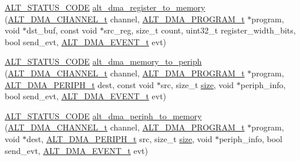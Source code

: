 \begin{DoxyCompactItemize}
\item 
\mbox{\hyperlink{hwlib_8h_abdb0d369f069723ca55d6c94bcaaaa12}{A\+L\+T\+\_\+\+S\+T\+A\+T\+U\+S\+\_\+\+C\+O\+DE}} \mbox{\hyperlink{group__ALT__DMA__STD__OPS_ga8539a5c42c3f59b8640252d203398962}{alt\+\_\+dma\+\_\+register\+\_\+to\+\_\+memory}} (\mbox{\hyperlink{group__ALT__DMA__COMMON_ga959232e3b00ce45a3049183cce4c9d59}{A\+L\+T\+\_\+\+D\+M\+A\+\_\+\+C\+H\+A\+N\+N\+E\+L\+\_\+t}} channel, \mbox{\hyperlink{group__ALT__DMA__PRG_gadb7028531574894854db4db6d797de97}{A\+L\+T\+\_\+\+D\+M\+A\+\_\+\+P\+R\+O\+G\+R\+A\+M\+\_\+t}} $\ast$program, void $\ast$dst\+\_\+buf, const void $\ast$src\+\_\+reg, size\+\_\+t count, uint32\+\_\+t register\+\_\+width\+\_\+bits, bool send\+\_\+evt, \mbox{\hyperlink{group__ALT__DMA__COMMON_gad02f1735ad41b201414e8d032e0f9426}{A\+L\+T\+\_\+\+D\+M\+A\+\_\+\+E\+V\+E\+N\+T\+\_\+t}} evt)
\item 
\mbox{\hyperlink{hwlib_8h_abdb0d369f069723ca55d6c94bcaaaa12}{A\+L\+T\+\_\+\+S\+T\+A\+T\+U\+S\+\_\+\+C\+O\+DE}} \mbox{\hyperlink{group__ALT__DMA__STD__OPS_gab857a70be266b57b97d4dab000dfbaff}{alt\+\_\+dma\+\_\+memory\+\_\+to\+\_\+periph}} (\mbox{\hyperlink{group__ALT__DMA__COMMON_ga959232e3b00ce45a3049183cce4c9d59}{A\+L\+T\+\_\+\+D\+M\+A\+\_\+\+C\+H\+A\+N\+N\+E\+L\+\_\+t}} channel, \mbox{\hyperlink{group__ALT__DMA__PRG_gadb7028531574894854db4db6d797de97}{A\+L\+T\+\_\+\+D\+M\+A\+\_\+\+P\+R\+O\+G\+R\+A\+M\+\_\+t}} $\ast$program, \mbox{\hyperlink{group__ALT__DMA__COMMON_gae9baf8ac891f0583f9c1c61528cc1736}{A\+L\+T\+\_\+\+D\+M\+A\+\_\+\+P\+E\+R\+I\+P\+H\+\_\+t}} dest, const void $\ast$src, size\+\_\+t \mbox{\hyperlink{sun4u_2tte_8h_a245260f6f74972558f61b85227df5aae}{size}}, void $\ast$periph\+\_\+info, bool send\+\_\+evt, \mbox{\hyperlink{group__ALT__DMA__COMMON_gad02f1735ad41b201414e8d032e0f9426}{A\+L\+T\+\_\+\+D\+M\+A\+\_\+\+E\+V\+E\+N\+T\+\_\+t}} evt)
\item 
\mbox{\hyperlink{hwlib_8h_abdb0d369f069723ca55d6c94bcaaaa12}{A\+L\+T\+\_\+\+S\+T\+A\+T\+U\+S\+\_\+\+C\+O\+DE}} \mbox{\hyperlink{group__ALT__DMA__STD__OPS_gaf55eeadb952bd684afb3ffafcc938597}{alt\+\_\+dma\+\_\+periph\+\_\+to\+\_\+memory}} (\mbox{\hyperlink{group__ALT__DMA__COMMON_ga959232e3b00ce45a3049183cce4c9d59}{A\+L\+T\+\_\+\+D\+M\+A\+\_\+\+C\+H\+A\+N\+N\+E\+L\+\_\+t}} channel, \mbox{\hyperlink{group__ALT__DMA__PRG_gadb7028531574894854db4db6d797de97}{A\+L\+T\+\_\+\+D\+M\+A\+\_\+\+P\+R\+O\+G\+R\+A\+M\+\_\+t}} $\ast$program, void $\ast$dest, \mbox{\hyperlink{group__ALT__DMA__COMMON_gae9baf8ac891f0583f9c1c61528cc1736}{A\+L\+T\+\_\+\+D\+M\+A\+\_\+\+P\+E\+R\+I\+P\+H\+\_\+t}} src, size\+\_\+t \mbox{\hyperlink{sun4u_2tte_8h_a245260f6f74972558f61b85227df5aae}{size}}, void $\ast$periph\+\_\+info, bool send\+\_\+evt, \mbox{\hyperlink{group__ALT__DMA__COMMON_gad02f1735ad41b201414e8d032e0f9426}{A\+L\+T\+\_\+\+D\+M\+A\+\_\+\+E\+V\+E\+N\+T\+\_\+t}} evt)
\end{DoxyCompactItemize}


